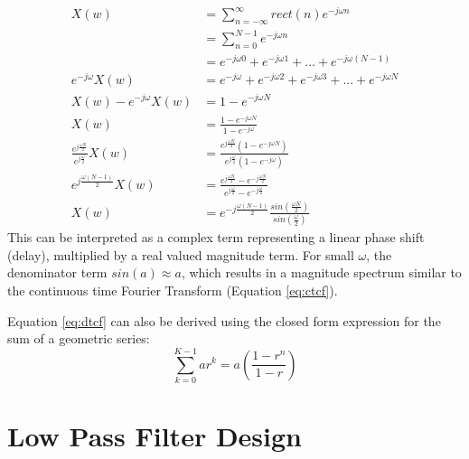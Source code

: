 \documentclass{article}
\begin{document}
\begin{equation} \label{eq:dtcf}
\begin{split}
                     X(w) &= \sum_{n=-\infty}^{\infty} rect(n) e^{-j \omega n} \\
                          &= \sum_{n=0}^{N-1} e^{-j \omega n} \\
                          &= e^{-j \omega 0} + e^{-j \omega 1} + ... + e^{-j \omega (N-1)} \\
       e^{-j \omega} X(w) &= e^{-j \omega} + e^{-j \omega 2} + e^{-j \omega 3} + ... + e^{-j \omega N} \\
X(w) - e^{-j \omega} X(w) &= 1 - e^{-j \omega N} \\
                     X(w) &= \frac{1 - e^{-j \omega N}}{1 - e^{-j \omega}} \\
\frac{e^{j \frac{\omega N}{2}}}{e^{j \frac{\omega}{2}}} X(w) &= \frac{e^{j \frac{\omega N}{2}}(1 - e^{-j \omega N})}{e^{j \frac{\omega}{2}}(1 - e^{-j \omega})} \\
e^{j \frac{\omega (N-1)}{2}} X(w) &= \frac{e^{j \frac{\omega N}{2}} - e^{-j \frac{\omega N}{2}}}{e^{j \frac{\omega}{2}} - e^{-j \frac{\omega}{2}}} \\
X(w) &= e^{-j \frac{\omega (N-1)}{2}} \frac{sin(\frac{\omega N}{2})}{sin(\frac{\omega}{2})}
\end{split}
\end{equation}
This can be interpreted as a complex term representing a linear phase shift (delay), multiplied by a real valued magnitude term.  For small $\omega$, the denominator term $sin(a) \approx a$, which results in a magnitude spectrum similar to the continuous time Fourier Transform (Equation \ref{eq:ctcf}).

Equation \ref{eq:dtcf} can also be derived using the closed form expression for the sum of a geometric series:
\begin{equation} \label{eq_geosum}
\sum_{k=0}^{K-1} ar^k = a \left( \frac{1-r^n}{1-r} \right)
\end{equation}

\section {Low Pass Filter Design}
\end{document}
